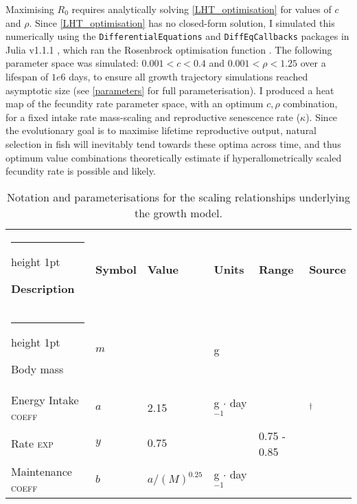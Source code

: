 \documentclass[a4paper]{article} %
\makeatletter
\newcommand{\thickhline}{%
    \noalign {\ifnum 0=`}\fi \hrule height 1pt
    \futurelet \reserved@a \@xhline
}
\makeatother
\begin{document}
\begin{center}
\begin{minipage}{\linewidth}
Maximising $R_0$ requires analytically solving \cref{LHT_optimisation} for values of $c$ and $\rho$. Since \cref{LHT_optimisation} has no closed-form solution, I simulated this numerically using the \texttt{DifferentialEquations} and \texttt{DiffEqCallbacks} packages in Julia v1.1.1 \autocite{Bezanson2017}, which ran the Rosenbrock optimisation function \autocite{Rosenbrock1960}. The following parameter space was simulated: $0.001 < c < 0.4$ \autocite{Roff1983, Enberg2008, Atiqulla2013} and $0.001 < \rho < 1.25$ over a lifespan of $1e6$ days, to ensure all growth trajectory simulations reached asymptotic size (see \cref{parameters} for full parameterisation). I produced a heat map of the fecundity rate parameter space, with an optimum $c, \rho$ combination, for a fixed intake rate mass-scaling and reproductive senescence rate ($\kappa$). Since the evolutionary goal is to maximise lifetime reproductive output, natural selection in fish will inevitably tend towards these optima across time, and thus optimum value combinations theoretically estimate if hyperallometrically scaled fecundity rate is possible and likely.
\begin{table}[h]
    \caption{Notation and parameterisations for the scaling relationships underlying the growth model.}
    \begin{tabularx}{\linewidth}{Xlllll}
    \thickhline
    \textbf{Description}                                    & \textbf{Symbol}       & \textbf{Value}            & \textbf{Units}        & \textbf{Range}                    & \textbf{Source}       \\ \thickhline
    Body mass                                               & $m$                   &                           & g                     &                                   &                       \\ \hline
    Energy Intake  \qquad      \textsc{coeff}                & $a$                   & 2.15                       & g $\cdot$ day$^{-1}$  &                       & \textcite{West2001}$^{\dagger}$       \\ 
    Rate           \qquad\qquad\quad\quad      \textsc{exp}   & $y$                   & $0.75$                    & \textsc{}             & 0.75 - 0.85                       & \textcite{Pawar2012}      \\ \hline
    Maintenance   \; \qquad \textsc{coeff}                     & $b$                   & $a/(M)^{0.25}$            & g $\cdot$ day$^{-1}$  &                                   & \textcite{West2001}       \\ 

\end{tabularx}
\end{table}
\end{minipage}
\end{center}
\end{document}
